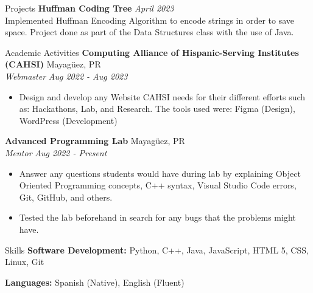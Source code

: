 \documentclass{resume} %
\begin{document}
\begin{rSection}{Projects}
{\bf Huffman Coding Tree} \hfill {\em April 2023}\\
Implemented Huffman Encoding Algorithm to encode strings in order to save space. Project done as part of the Data Structures class with the use of Java.
\end{rSection}
\begin{rSection}{Academic Activities}
{\bf Computing Alliance of Hispanic-Serving Institutes (CAHSI)} \hfill {Mayagüez, PR} 
\\
\textit{Webmaster} \hfill {\em Aug 2022 - Aug 2023}
\vspace{-0.2\baselineskip} %
\begin{itemize}[noitemsep]
    \item Design and develop any Website CAHSI needs for their different efforts such as: Hackathons, Lab, and Research. The tools used were: Figma (Design), WordPress (Development) 
\end{itemize}

{\bf Advanced Programming Lab } \hfill {Mayagüez, PR}
\\
\textit{Mentor} \hfill {\em Aug 2022 - Present}
\vspace{-0.2\baselineskip} %
\begin{itemize}[noitemsep]
    \item Answer any questions students would have during lab by explaining Object Oriented Programming concepts, C++ syntax, Visual Studio Code errors, Git, GitHub, and others.
    \item Tested the lab beforehand in search for any bugs that the problems might have. 
\end{itemize}
\end{rSection}
\begin{rSection}{Skills}
{\bf Software Development:} Python, C++, Java, JavaScript, HTML 5, CSS, Linux, Git

{\bf Languages: }Spanish (Native), English (Fluent)
\end{rSection}
\end{document}
